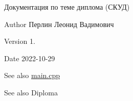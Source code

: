 Документация по теме диплома (СКУД) \begin{DoxyAuthor}{Author}
Перлин Леонид Вадимович 
\end{DoxyAuthor}
\begin{DoxyVersion}{Version}
1. 
\end{DoxyVersion}
\begin{DoxyDate}{Date}
2022-\/10-\/29 
\end{DoxyDate}
\begin{DoxyParagraph}{}

\end{DoxyParagraph}
\begin{DoxySeeAlso}{See also}
\mbox{\hyperlink{main_8cpp}{main.\+cpp}} 
\end{DoxySeeAlso}
\begin{DoxyParagraph}{}

\end{DoxyParagraph}
\begin{DoxySeeAlso}{See also}
Diploma 
\end{DoxySeeAlso}
